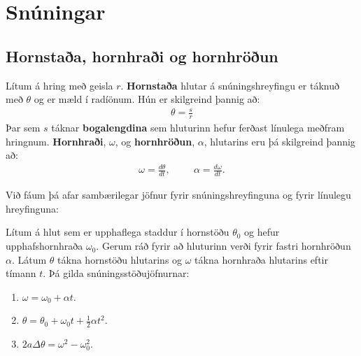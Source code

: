 \ifdefined \wholebook \else\documentclass[oneside]{book}\usepackage{EdlBook}\graphicspath{{figures/}}
\begin{document}
%
\setcounter{chapter}{8} %
%
\fi

\renewcommand{\thefigure}{\arabic{figure}}


\chapter{Snúningar}

\section{Hornstaða, hornhraði og hornhröðun}


\begin{tcolorbox}
\begin{definition} \label{def:hornstada}
Lítum á hring með geisla $r$. \textbf{Hornstaða} hlutar á snúningshreyfingu er táknuð með $\theta$ og er mæld í radíönum. Hún er skilgreind þannig að:
\begin{align*}
    \theta = \frac{s}{r}
\end{align*}
Þar sem $s$ táknar \textbf{bogalengdina} sem hluturinn hefur ferðast línulega meðfram hringnum. \textbf{Hornhraði}, $\omega$, og \textbf{hornhröðun}, $\alpha$, hlutarins eru þá skilgreind þannig að:
\begin{align*}
    \omega = \frac{d\theta}{dt}, \hspace{1cm} \alpha = \frac{d\omega}{dt}.
\end{align*}
\end{definition}
\end{tcolorbox}

Við fáum þá afar sambærilegar jöfnur fyrir snúningshreyfinguna og fyrir línulegu hreyfinguna:


\begin{tcolorbox}
\begin{theorem}
Lítum á hlut sem er upphaflega staddur í hornstöðu $\theta_0$ og hefur upphafshornhraða $\omega_0$. Gerum ráð fyrir að hluturinn verði fyrir fastri hornhröðun $\alpha$. Látum $\theta$ tákna hornstöðu hlutarins og $\omega$ tákna hornhraða hlutarins eftir tímann $t$. Þá gilda snúningsstöðujöfnurnar:

\begin{enumerate}[label = \textbf{(\roman*)}]
    \item $\omega = \omega_0 + \alpha t$.

    \item $\theta = \theta_0 + \omega_0 t + \frac{1}{2}\alpha t^2$.
    
    \item $2a \Delta \theta = \omega^2 - \omega_0^2$.
\end{enumerate}
\end{theorem}
\end{tcolorbox}
\end{document}

